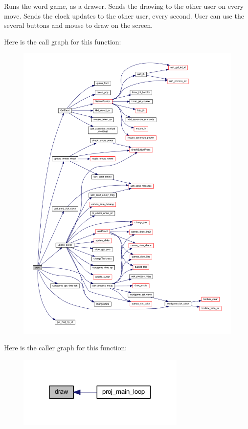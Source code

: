 Runs the word game, as a drawer. Sends the drawing to the other user on every move. Sends the clock updates to the other user, every second. User can use the several buttons and mouse to draw on the screen. 

Here is the call graph for this function\+:\nopagebreak
\begin{figure}[H]
\begin{center}
\leavevmode
\includegraphics[width=350pt]{group__pengoo_ga56c5cf8a568cff737ff95520cbe6b405_cgraph}
\end{center}
\end{figure}
Here is the caller graph for this function\+:\nopagebreak
\begin{figure}[H]
\begin{center}
\leavevmode
\includegraphics[width=235pt]{group__pengoo_ga56c5cf8a568cff737ff95520cbe6b405_icgraph}
\end{center}
\end{figure}
\mbox{\label{group__pengoo_ga4202fa5c5191c7e387d7570da6c8cd8c}} 
